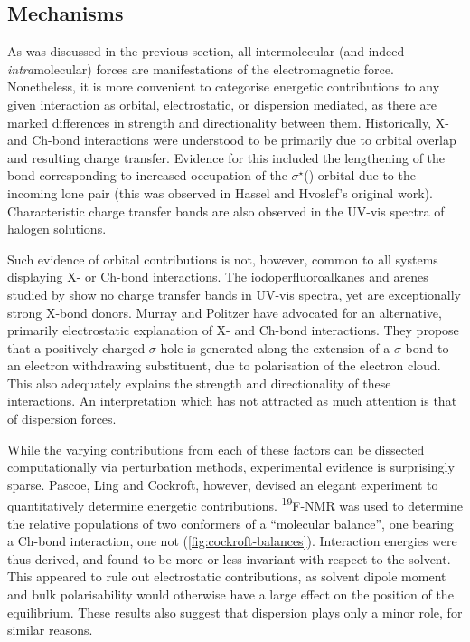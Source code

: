 \begin{refsection}
\subsection{Mechanisms}
As was discussed in the previous section, all intermolecular (and indeed \emph{intra}mole\-cular) forces are manifestations of the electromagnetic force.
Nonetheless, it is more convenient to categorise energetic contributions to any given interaction as orbital, electrostatic, or dispersion mediated, as there are marked differences in strength and directionality between them.
Historically, X- and Ch-bond interactions were understood to be primarily due to orbital overlap and resulting charge transfer.
Evidence for this included the lengthening of the  bond corresponding to increased occupation of the $\sigma^{\star}$() orbital due to the incoming lone pair (this was observed in Hassel and Hvoslef's original work\autocite{Hassel1954}).
Characteristic charge transfer bands are also observed in the UV-vis spectra of halogen solutions.\autocite{Blackstock1987}

Such evidence of orbital contributions is not, however, common to all systems displaying X- or Ch-bond interactions.
The iodoperfluoroalkanes and arenes studied by \citeauthor{Yan2014} show no charge transfer bands in UV-vis spectra, yet are exceptionally strong X-bond donors.\autocite{Yan2014}
Murray and Politzer have advocated for an alternative, primarily electrostatic explanation of X- and Ch-bond interactions.\autocite{Murray2008,Murray2009}
They propose that a positively charged $ \sigma $-hole is generated along the extension of a $ \sigma $ bond to an electron withdrawing substituent, due to polarisation of the electron cloud.
This also adequately explains the strength and directionality of these interactions.
An interpretation which has not attracted as much attention is that of dispersion forces.

While the varying contributions from each of these factors can be dissected computationally via perturbation methods, experimental evidence is surprisingly sparse.
Pascoe, Ling and Cockroft, however, devised an elegant experiment to quantitatively determine energetic contributions.\autocite{Pascoe2017}
\textsuperscript{19}F-NMR was used to determine the relative populations of two conformers of a ``molecular balance'', one bearing a Ch-bond interaction, one not (\cref{fig:cockroft-balances}).
Interaction energies were thus derived, and found to be more or less invariant with respect to the solvent.
This appeared to rule out electrostatic contributions, as solvent dipole moment and bulk polarisability would otherwise have a large effect on the position of the equilibrium.
These results also suggest that dispersion plays only a minor role, for similar reasons.


\end{refsection}
